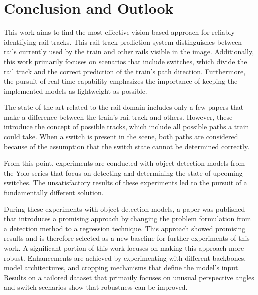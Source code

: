 \clearpage
\chapter{Conclusion and Outlook}
\label{sec:conclusionAndOutlook}

This work aims to find the most effective vision-based approach for reliably identifying rail tracks.
This rail track prediction system distinguishes between rails currently used by the train and other rails visible in the image.
Additionally, this work primarily focuses on scenarios that include switches, which divide the rail track and the correct prediction of the train's path direction.
Furthermore, the pursuit of real-time capability emphasizes the importance of keeping the implemented models as lightweight as possible.

The state-of-the-art related to the rail domain includes only a few papers that make a difference between the train's rail track and others.
However, these introduce the concept of possible tracks, which include all possible paths a train could take.
When a switch is present in the scene, both paths are considered because of the assumption that the switch state cannot be determined correctly.

From this point, experiments are conducted with object detection models from the Yolo series that focus on detecting and determining the state of upcoming switches.
The unsatisfactory results of these experiments led to the pursuit of a fundamentally different solution.

During these experiments with object detection models, a paper was published that introduces a promising approach by changing the problem formulation from a detection method to a regression technique.
This approach showed promising results and is therefore selected as a new baseline for further experiments of this work.
A significant portion of this work focuses on making this approach more robust.
Enhancements are achieved by experimenting with different backbones, model architectures, and cropping mechanisms that define the model's input.
Results on a tailored dataset that primarily focuses on unusual perspective angles and switch scenarios show that robustness can be improved.

